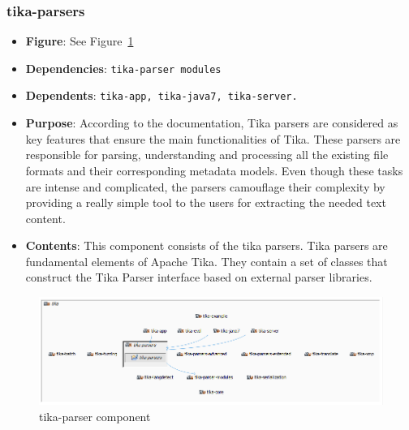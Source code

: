 \documentclass{article}
\begin{document}
\subsubsection{tika-parsers}
\begin {itemize}
\item \textbf{Figure}: See Figure~\ref{fig:tika-parser}
\item \textbf{Dependencies}: \texttt{tika-parser modules}
\item \textbf{Dependents}: \texttt{tika-app, tika-java7, tika-server.}
\item \textbf{Purpose}: According to the documentation, Tika parsers are considered as key features that ensure the main functionalities of Tika. These parsers are responsible for parsing, understanding and processing all the existing file formats and their corresponding metadata models. Even though these tasks are intense and complicated, the parsers camouflage their complexity by providing a really simple tool to the users for extracting the needed text content.
\item \textbf{Contents}: This component consists of the tika parsers. Tika parsers are fundamental elements of Apache Tika. They contain a set of classes that construct the Tika Parser interface based on external parser libraries. 
\end{itemize}
\begin{figure}[ht]
    \centering
    \includegraphics[width=1\textwidth]{report/images/tika-parser.PNG}
    \caption{tika-parser component}
    \label{fig:tika-parser}
\end{figure}
\end{document}
